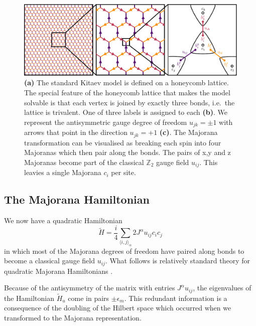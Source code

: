 \begin{figure}
\hypertarget{fig:intro_figure_by_hand}{%
\centering
\includegraphics[width=1\textwidth,height=\textheight]{figure_code/amk_chapter/intro/honeycomb_zoom/intro_figure_by_hand}
\caption[The Kitaev Honeycomb Model]{\textbf{(a)} The standard Kitaev model is defined on a
honeycomb lattice. The special feature of the honeycomb lattice that
makes the model solvable is that each vertex is joined by exactly three
bonds, i.e.~the lattice is trivalent. One of three labels is assigned to
each \textbf{(b)}. We represent the antisymmetric gauge degree of
freedom \(u_{jk} = \pm 1\) with arrows that point in the direction
\(u_{jk} = +1\) \textbf{(c)}. The Majorana transformation can be
visualised as breaking each spin into four Majoranas which then pair
along the bonds. The pairs of x,y and z Majoranas become part of the
classical \(\mathbb{Z}_2\) gauge field \(u_{ij}\). This leavies a single
Majorana \(c_i\) per site.}\label{fig:intro_figure_by_hand}
}
\end{figure}

\hypertarget{the-majorana-hamiltonian}{%
\subsection{The Majorana Hamiltonian}\label{the-majorana-hamiltonian}}

We now have a quadratic Hamiltonian \[ \tilde{H} =  \frac{i}{4} \sum_{\langle i,j\rangle_\alpha} 2J^{\alpha} u_{ij} c_i c_j\] in which most of the Majorana degrees of freedom have paired along bonds to become a classical gauge field \(u_{ij}\). What follows is relatively standard theory for quadratic Majorana Hamiltonians \autocite{BlaizotRipka1986}.

Because of the antisymmetry of the matrix with entries \(J^{\alpha} u_{ij}\), the eigenvalues of the Hamiltonian \(\tilde{H}_u\) come in pairs \(\pm \epsilon_m\). This redundant information is a consequence of the doubling of the Hilbert space which occurred when we transformed to the Majorana representation.

